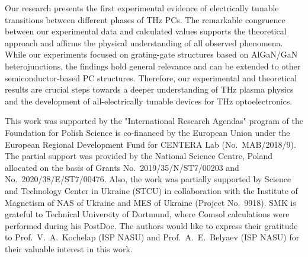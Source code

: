 \documentclass[%
 reprint,
 amsmath,amssymb,
 aps,
]{revtex4-2}
\begin{document}
Our research presents the first experimental evidence of electrically tunable transitions between different phases of THz PCs. The remarkable congruence between our experimental data and calculated values supports the theoretical approach and affirms the physical understanding of all observed phenomena. While our experiments focused on grating-gate structures based on AlGaN/GaN heterojunctions, the findings hold general relevance and can be extended to other semiconductor-based PC structures.
Therefore, our experimental and theoretical results are crucial steps towards a deeper understanding of THz plasma physics and the development of all-electrically tunable devices for THz optoelectronics.


\begin{acknowledgments}
This work was supported by the  "International  Research Agendas" program of the Foundation for Polish Science is co-financed by the European Union under the European Regional Development Fund for CENTERA Lab (No.~MAB/2018/9). The partial support was provided by the National Science Centre, Poland allocated on the basis of Grants No.~2019/35/N/ST7/00203 and No.~2020/38/E/ST7/00476. Also, the work was partially supported by Science and Technology Center in Ukraine (STCU) in collaboration with the Institute of Magnetism of NAS of Ukraine and MES of Ukraine (Project No.~9918). SMK is grateful to Technical University of Dortmund, where Comsol calculations were performed during his PostDoc.  The authors would like to express their gratitude to Prof.~V.~A.~Kochelap (ISP NASU) and Prof.~A.~E.~Belyaev (ISP NASU) for their valuable interest in this work.
\end{acknowledgments}


\nocite{*}



\clearpage
\end{document}
